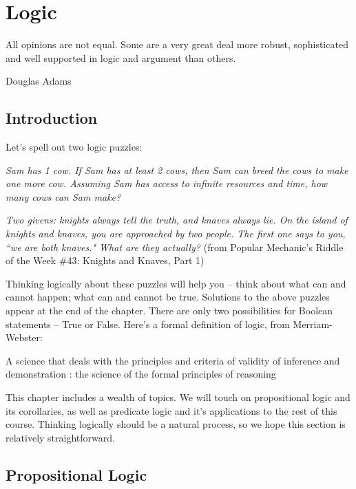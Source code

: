 \documentclass[main.tex]{subfiles}
\begin{document}
\chapter{Logic}
\label{chapter:logic}

\epigraph{All opinions are not equal. Some are a very great deal more robust, sophisticated and well supported in logic and argument than others.}{Douglas Adams}

\minitoc

\section{Introduction}

Let's spell out two logic puzzles:

\begin{center}
	\textit{Sam has 1 cow. If Sam has at least 2 cows, then Sam can breed the cows to make one more cow. Assuming Sam has access to infinite resources and time, how many cows can Sam make?}
\end{center}

\begin{center}
	\textit{Two givens: knights always tell the truth, and knaves always lie. On the island of knights and knaves, you are approached by two people. The first one says to you, ``we are both knaves." What are they actually?} (from Popular Mechanic's Riddle of the Week \#43: Knights and Knaves, Part 1)
\end{center}

Thinking logically about these puzzles will help you -- think about what can and cannot happen; what can and cannot be true. Solutions to the above puzzles appear at the end of the chapter. There are only two possibilities for Boolean statements -- True or False. Here's a formal definition of logic, from Merriam-Webster:

\begin{defn}
	A science that deals with the principles and criteria of validity of inference and demonstration : the science of the formal principles of reasoning
\end{defn}

This chapter includes a wealth of topics. We will touch on propositional logic and its corollaries, as well as predicate logic and it's applications to the rest of this course. Thinking logically should be a natural process, so we hope this section is relatively straightforward.

\section{Propositional Logic}
\end{document}
